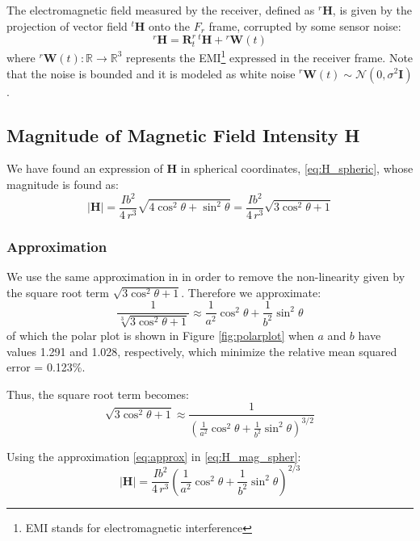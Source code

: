 The electromagnetic field measured by the receiver, defined as  \( {}^r \mathbf{H} \), 
is given by the projection of vector field \( {}^t\mathbf{H} \) onto the \( F_r \) frame, 
corrupted by some sensor noise:
\begin{equation}
    {}^r\mathbf{H} =  \mathbf{R}^r_t \, {}^t\mathbf{H} + {}^r\mathbf{W}(t)
    \label{eq:H_rotated_noise}
\end{equation}
where \( {}^r\mathbf{W}(t) : \mathbb{R} \rightarrow \mathbb{R}^3 \) represents the 
EMI\footnote{EMI stands for electromagnetic interference} 
expressed in the receiver frame. 
Note that the noise is bounded and it is modeled as white noise 
${}^r\mathbf{W}(t) \sim \mathcal{N}(0, \sigma^2 \mathbf{I})$.

\subsection{Magnitude of Magnetic Field Intensity H}
We have found an expression of $\mathbf{H}$ in spherical coordinates, \ref{eq:H_spheric}, whose magnitude is found as:
\begin{equation}
    \left| \mathbf{H} \right| = \frac{I b^2}{4 \, r^3} \sqrt{ 4 \cos^2 \theta + \sin^2 \theta} = \frac{I b^2}{4 \, r^3} \sqrt{ 3 \cos^2 \theta + 1}
    \label{eq:H_mag_spher}
\end{equation}

\subsubsection{Approximation}
We use the same approximation in \cite{main} in order to remove the non-linearity given by the square root term $\sqrt{ 3 \cos^2 \theta + 1}$. Therefore we approximate:
\[
\frac{1}{\sqrt[3]{ 3 \cos^2 \theta + 1}} \approx \frac{1}{a^2 }\cos^2 \theta + \frac{1}{b^2} \sin^2 \theta
\]
of which the polar plot is shown in Figure \ref{fig:polarplot} when $a$ and $b$ have values 1.291 and 1.028, 
respectively, which minimize the relative mean squared error = 0.123\%.


Thus, the square root term becomes:
\begin{equation}
    \sqrt{ 3 \cos^2 \theta + 1} \approx \frac{1}{\left(\frac{1}{a^2} \cos^2 \theta + \frac{1}{b^2} \sin^2 \theta\right)^{3/2}}
    \label{eq:approx}
\end{equation}

Using the approximation \eqref{eq:approx} in \eqref{eq:H_mag_spher}:
\begin{equation}
    \left| \mathbf{H} \right| = \frac{I b^2}{4 \, r^3} \left(\frac{1}{a^2} \cos^2 \theta + \frac{1}{b^2} \sin^2 \theta\right)^{2/3}
    \label{eq:H_mag_approx}
\end{equation}

